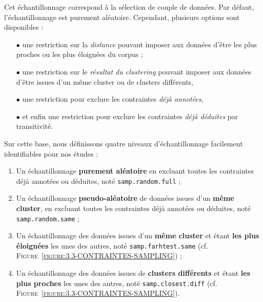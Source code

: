 		Cet échantillonnage correspond à la sélection de couple de données.
		Par défaut, l'échantillonnage est purement aléatoire.
		Cependant, plusieurs options sont disponibles :
		
		\begin{itemize}
			\item[\(\bullet\)] une restriction sur la \textit{distance} pouvant imposer aux données d'être les plus proches ou les plus éloignées du corpus ;
			\item[\(\bullet\)] une restriction sur le \textit{résultat du clustering} pouvant imposer aux données d'être issues d'un même cluster ou de clusters différents,
			\item[\(\bullet\)] une restriction pour exclure les contraintes \textit{déjà annotées},
			\item[\(\bullet\)] et enfin une restriction pour exclure les contraintes \textit{déjà déduites} par transitivité.
		\end{itemize}
		
		Sur cette base, nous définissons quatre niveaux d'échantillonnage facilement identifiables pour nos études :
		\begin{enumerate}
			\item Un échantillonnage \textbf{purement aléatoire} en excluant toutes les contraintes déjà annotées ou déduites, noté \texttt{samp.random.full} ;
			\item Un échantillonnage \textbf{pseudo-aléatoire} de données issues d'un \textbf{même cluster}, en excluant toutes les contraintes déjà annotées ou déduites, noté \texttt{samp.random.same} ;
			\item Un échantillonnage des données issues d'un \textbf{même cluster} et étant \textbf{les plus éloignées} les unes des autres, noté \texttt{samp.farhtest.same} (cf. \textsc{Figure~\ref{figure:3.3-CONTRAINTES-SAMPLING}}) ;
			\item Un échantillonnage des données issues de \textbf{clusters différents} et étant \textbf{les plus proches} les unes des autres, noté \texttt{samp.closest.diff} (cf. \textsc{Figure~\ref{figure:3.3-CONTRAINTES-SAMPLING}}).
		\end{enumerate}
		
